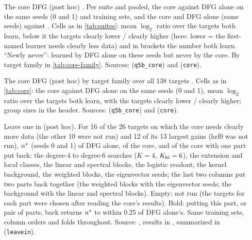 \begin{table}[t]
\centering{\footnotesize\setlength{\tabcolsep}{3pt}\renewcommand{\arraystretch}{1.05}
}
\caption{The core DFG (post hoc) . Per suite and pooled, the core against DFG alone on the same seeds (0 and 1) and training sets, and the core and DFG alone (same seeds) against . Cells as in \cref{tab:suites}: mean $\log_2$ ratio over the targets both learn, below it the targets clearly lower / clearly higher (here: lower = the first-named learner needs clearly less data) and in brackets the number both learn. ``Newly never'': learned by DFG alone on these seeds but never by the core. By target family in \cref{tab:core-family}. Sources:  (\texttt{q5b\_core}) and  (\texttt{core}).}
\label{tab:core}
\end{table}

\begin{table}[t]
\centering{\footnotesize\setlength{\tabcolsep}{1.6pt}\renewcommand{\arraystretch}{1.05}
}
\caption{The core DFG (post hoc) by target family over all 138 targets . Cells as in \cref{tab:core}: the core against DFG alone on the same seeds (0 and 1), mean $\log_2$ ratio over the targets both learn, with the targets clearly lower / clearly higher; group sizes in the header. Sources:  (\texttt{q5b\_core}) and  (\texttt{core}).}
\label{tab:core-family}
\end{table}

\begin{table}[t]
\centering{\footnotesize\setlength{\tabcolsep}{3.2pt}\renewcommand{\arraystretch}{1.02}
}
\caption{Leave one in (post hoc). For 16 of the 26 targets on which the core needs clearly more data (the other 10 were not run) and 12 of its 13 largest gains (hrf0 was not run), $\nstar$ (seeds 0 and 1) of DFG alone, of the core, and of the core with one part put back: the degree-4 to degree-6 searches ($K=4$, $K_{\rm hi}=6$), the extension and local classes, the linear and spectral blocks, the logistic readout, the kernel background, the weighted blocks, the eigenvector seeds; the last two columns put two parts back together (the weighted blocks with the eigenvector seeds; the background with the linear and spectral blocks). Empty: not run (the targets for each part were chosen after reading the core's results). Bold: putting this part, or pair of parts, back returns $\nstar$ to within 0.25 of DFG alone's. Same training sets, column orders and folds throughout. Source: , results in , summarized in  (\texttt{leavein}).}
\label{tab:leavein}
\end{table}
